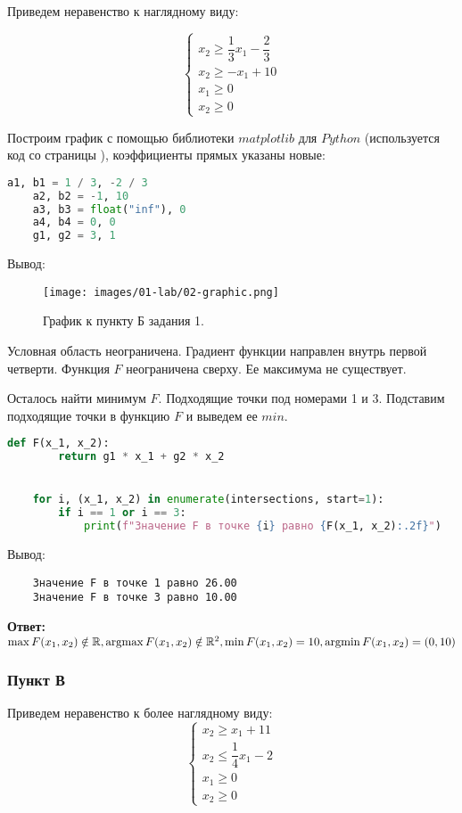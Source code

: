 Приведем неравенство к наглядному виду:

\[
    \begin{cases}
        x_2 \geq \dfrac{1}{3} x_1 - \dfrac{2}{3}\\
        x_2 \geq -x_1 + 10\\
        x_1 \geq 0\\
        x_2 \geq 0
    \end{cases}
\]

Построим график с помощью библиотеки $matplotlib$ для $Python$ (используется код со страницы \pageref{code: 01-lab-01-code}), коэффициенты прямых указаны новые:

\begin{lstlisting}[language=Python]
    a1, b1 = 1 / 3, -2 / 3
    a2, b2 = -1, 10
    a3, b3 = float("inf"), 0
    a4, b4 = 0, 0
    g1, g2 = 3, 1
\end{lstlisting}
Вывод:
\begin{figure}[H]
    \texttt{[image: images/01-lab/02-graphic.png]}
    \caption{График к пункту Б задания 1.}
    \label{fig:01-lab-02-graphic}
\end{figure}

Условная область неограничена. Градиент функции направлен внутрь первой четверти. Функция $F$ неограничена сверху. Ее максимума не существует.

Осталось найти минимум $F$. Подходящие точки под номерами 1 и 3. Подставим подходящие точки в функцию $F$ и выведем ее $min$.
\begin{lstlisting}[language=Python]
    def F(x_1, x_2):
        return g1 * x_1 + g2 * x_2


    for i, (x_1, x_2) in enumerate(intersections, start=1):
        if i == 1 or i == 3:
            print(f"Значение F в точке {i} равно {F(x_1, x_2):.2f}")
\end{lstlisting} 
Вывод:
\begin{verbatim}
    Значение F в точке 1 равно 26.00
    Значение F в точке 3 равно 10.00
\end{verbatim}

\textbf{Ответ:} $\max F(x_1, x_2) \notin \mathbb R, \operatorname*{argmax} F(x_1, x_2) \notin \mathbb R^2, \min F(x_1, x_2) = 10, \operatorname*{argmin} F(x_1, x_2) = (0, 10)$

\subsubsection{Пункт В}

Приведем неравенство к более наглядному виду:
\[
    \begin{cases}
        x_2 \geq x_1 + 11\\
        x_2 \leq \dfrac{1}{4}x_1 - 2\\
        x_1 \geq 0\\
        x_2 \geq 0
    \end{cases}
\]

